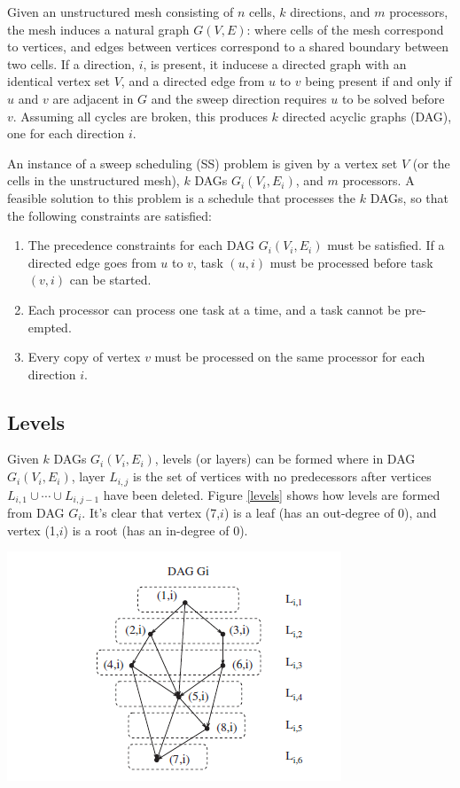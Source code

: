 \documentclass[11pt, letterpaper,titlepage,oneside]{article}
\begin{document}
Given an unstructured mesh consisting of $n$ cells, $k$ directions, and $m$ processors, the mesh induces a natural graph $G(V,E)$: where cells of the mesh correspond to vertices, and edges between vertices correspond to a shared boundary between two cells. If a direction, $i$, is present, it inducese a directed graph with an identical vertex set $V$, and a directed edge from $u$ to $v$ being present if and only if $u$ and $v$ are adjacent in $G$ and the sweep direction requires $u$ to be solved before $v$. Assuming all cycles are broken, this produces $k$ directed acyclic graphs (DAG), one for each direction $i$. 

An instance of a sweep scheduling (SS) problem is given by a vertex set $V$ (or the cells in the unstructured mesh), $k$ DAGs $G_i(V_i,E_i)$, and $m$ processors. A feasible solution to this problem is a schedule that processes the $k$ DAGs, so that the following constraints are satisfied:
\begin{enumerate}
\item The precedence constraints for each DAG $G_i(V_i,E_i)$ must be satisfied. If a directed edge goes from $u$ to $v$, task $(u,i)$ must be processed before task $(v,i)$ can be started.
\item Each processor can process one task at a time, and a task cannot be pre-empted.
\item Every copy of vertex $v$ must be processed on the same processor for each direction $i$. 
\end{enumerate}

\subsection*{Levels}

Given $k$ DAGs $G_i(V_i,E_i)$, levels (or layers) can be formed where in DAG $G_i(V_i,E_i)$, layer $L_{i,j}$ is the set of vertices with no predecessors after vertices $L_{i,1}\cup\cdots\cup L_{i,j-1}$ have been deleted. Figure \ref{levels} shows how levels are formed from DAG $G_{i}$. It's clear that vertex (7,$i$) is a leaf (has an out-degree of 0), and vertex (1,$i$) is a root (has an in-degree of 0).

\bigskip

\noindent\begin{minipage}{\textwidth}
\centering
\includegraphics[scale = 1]{Levels.png}
\label{levels}
\end{minipage}
\end{document}

